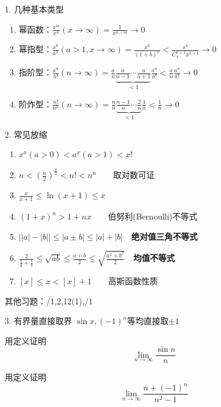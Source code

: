 \documentclass{myslide}
\begin{document}
\begin{frame}{1. 几种基本类型}
\begin{enumerate}
	\item 幂函数：$\displaystyle\frac{x^m}{x^n}(x\to\infty)=\frac{1}{x^{n-m}}\to 0$
	\item 幂指型：$\displaystyle\frac{x^k}{a^x}(a>1,x\to\infty)=\frac{x^k}{(1+b)^x}<\frac{x^k}{C_x^{k+1}x^{k+1}}\to 0$
	\item 指阶型：$\displaystyle\frac{a^n}{n!}(n\to\infty)=\frac{a}{n}\underbrace{\frac{a}{n-1}\cdots\frac{a}{a+1}}_{<1}\frac{a^a}{a!}<\frac{a}{n}\frac{a^n}{a!}\to 0$
	\item 阶炸型：$\displaystyle\frac{n!}{n^n}(n\to\infty)=\frac{n}{n}\underbrace{\frac{n-1}{n}\cdots\frac{2}{n}}_{<1}\frac{1}{n}<\frac{1}{n}\to 0$
\end{enumerate}
\end{frame}

\begin{frame}{2. 常见放缩}
\begin{enumerate}
	\item $x^a(a>0)<a^x(a>1)<x!$
	\item $\displaystyle n<\left(\frac{n}{2}\right)^{\frac{n}{2}}<n!<n^n\qquad$取对数可证
	\item $\displaystyle \frac{x}{x+1}\leq\ln(x+1)\leq x$
	\item $\displaystyle (1+x)^n>1+nx\qquad$伯努利(Bernoulli)不等式
	\item $\Big||a|-|b|\Big|\leq|a\pm b|\leq|a|+|b|\quad$\textbf{绝对值三角不等式}
	\item $\displaystyle \frac{2}{\frac{1}{a}+\frac{1}{b}}\leq\sqrt{ab}\leq\frac{a+b}{2}\leq\sqrt{\frac{a^2+b^2}{2}}\quad$\textbf{均值不等式}
	\item $[x]\leq x<[x]+1\qquad$高斯函数性质
\end{enumerate}
其他习题：/1,2,12(1),/1
\end{frame}

\begin{frame}{3. 有界量直接取界}
$\sin x,(-1)^n$等均直接取$\pm 1$
\begin{example}[\textsection 3.2/1(2)]
用定义证明
\[\lim_{n\to\infty}\frac{\sin n}{n}\]
\end{example}
\begin{example}[\textsection 3.2/1(4)]
用定义证明
\[\lim_{n\to\infty}\frac{n+(-1)^n}{n^2-1}\]
\end{example}
\end{frame}
\end{document}
